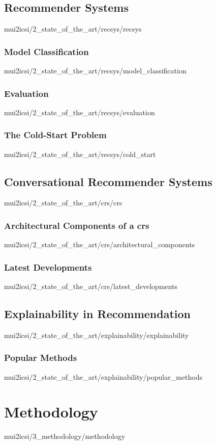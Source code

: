 \documentclass[english,epsbased,copyright,final,printable,covers,extendedindex,firstnumbered,tfm,gnuplot,loc,loe,lof,lot]{tfgtfmthesisuam}
\begin{document}
    \section{Recommender Systems\label{SEC:RECSYS}}{mui2icsi/2_state_of_the_art/recsys/recsys}
      \subsection{Model Classification\label{SS:MODELCLASS}}{mui2icsi/2_state_of_the_art/recsys/model_classification}
      \subsection{Evaluation\label{SS:RECSYSEVAL}}{mui2icsi/2_state_of_the_art/recsys/evaluation}
      \subsection{The Cold-Start Problem\label{SS:COLDSTART}}{mui2icsi/2_state_of_the_art/recsys/cold_start}

    \section{Conversational Recommender Systems\label{SEC:CRS}}{mui2icsi/2_state_of_the_art/crs/crs}
      \subsection{Architectural Components of a \acs{crs}\label{SS:CRSARCH}}{mui2icsi/2_state_of_the_art/crs/architectural_components}
      \subsection{Latest Developments\label{SS:CRSDEVS}}{mui2icsi/2_state_of_the_art/crs/latest_developments}

    \section{Explainability in Recommendation\label{SEC:EXPLAINABILITY}}{mui2icsi/2_state_of_the_art/explainability/explainability}
      \subsection{Popular Methods\label{SS:POPMETHODS}}{mui2icsi/2_state_of_the_art/explainability/popular_methods}

  \chapter{Methodology\label{CAP:METHODOLOGY}}{mui2icsi/3_methodology/methodology}
\end{document}
